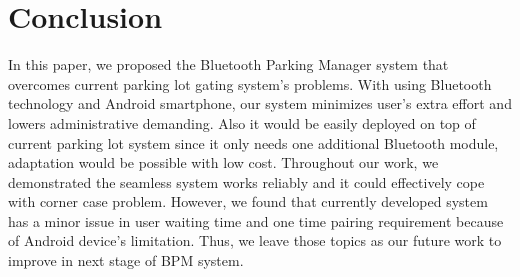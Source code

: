 \section{Conclusion}

In this paper, we proposed the Bluetooth Parking Manager system that overcomes current parking lot gating system's problems. With using Bluetooth technology and Android smartphone, our system minimizes user's extra effort and lowers administrative demanding.  Also it would be easily deployed on top of current parking lot system since it only needs one additional Bluetooth module, adaptation would be possible with low cost. Throughout our work, we demonstrated the seamless system works reliably and it could effectively cope with corner case problem. However, we found that currently developed system has a minor issue in user waiting time and one time pairing requirement because of Android device's limitation. Thus, we leave those topics as our future work to improve in next stage of BPM system.